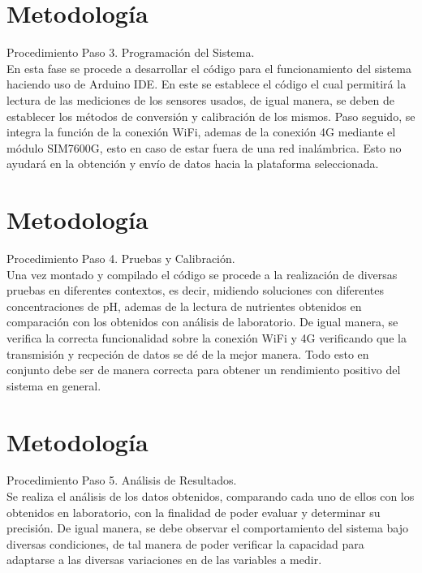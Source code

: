 \documentclass{beamer}
\begin{document}
\section{Metodología}
\begin{frame}{Procedimiento}
{Paso 3. Programación del Sistema.}\\

En esta fase se procede a desarrollar el código para el funcionamiento del sistema haciendo uso de Arduino IDE. En este se establece el código el cual permitirá la lectura de las mediciones de los sensores usados, de igual manera, se deben de establecer los métodos de conversión y calibración de los mismos.
Paso seguido, se integra la función de la conexión WiFi, ademas de la conexión 4G mediante el módulo SIM7600G, esto en caso de estar fuera de una red inalámbrica.
Esto no ayudará en la obtención y envío de datos hacia la plataforma seleccionada.\\

\end{frame}

\section{Metodología}
\begin{frame}{Procedimiento}
{Paso 4. Pruebas y Calibración.}\\

Una vez montado y compilado el código se procede a la realización de diversas pruebas en diferentes contextos, es decir, midiendo soluciones con diferentes concentraciones de pH, ademas de la lectura de nutrientes obtenidos en comparación con los obtenidos con análisis de laboratorio.
De igual manera, se verifica la correcta funcionalidad sobre la conexión WiFi y 4G verificando que la transmisión y recpeción de datos se dé de la mejor manera. 
Todo esto en conjunto debe ser de manera correcta para obtener un rendimiento positivo del sistema en general.\\

\end{frame}  

\section{Metodología}
\begin{frame}{Procedimiento}
{Paso 5. Análisis de Resultados.}\\

Se realiza el análisis de los datos obtenidos, comparando cada uno de ellos con los obtenidos en laboratorio, con la finalidad de poder evaluar y determinar su precisión.
De igual manera, se debe observar el comportamiento del sistema bajo diversas condiciones, de tal manera de poder verificar la capacidad para adaptarse a las diversas variaciones en de las variables a medir.\\

\end{frame}  
\end{document}
